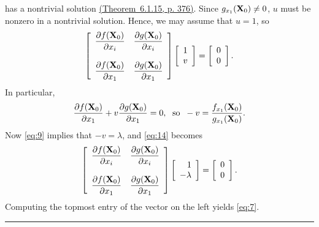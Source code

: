 \documentclass{article}
\newcommand{\bbox}{\phantom{1}\hfill{\rule{6pt}{6pt}}}
\newcommand{\dst}{\displaystyle}
\begin{document}
has a nontrivial
solution
\href{http://ramanujan.math.trinity.edu/wtrench/index.shtml}
{(Theorem~6.1.15, p. 376)}.
 Since $g_{x_{1}}({\bf X}_{0})\ne0$, $u$ must be nonzero in a
nontrivial solution. Hence, we may assume that $u=1$, so
\begin{equation} \label{eq:14}
 \left[\begin{array}{ccccccc}
\dst{\frac{{\partial f({\bf X}_{0})}}{{\partial x_{i}}}}&
\dst{\frac{{\partial g({\bf X}_{0})}}{{\partial x_{i}}}}\\\\
\dst{\frac{{\partial f({\bf X}_{0})}}{{\partial x_{1}}}}&
\dst{\frac{{\partial g({\bf X}_{0})}}{{\partial x_{1}}}} \end{array}\right]
\left[\begin{array}{ccccccc} 1\\ v \end{array}\right]=
\left[\begin{array}{ccccccc} 0\\0 \end{array}\right].
\end{equation}
In particular,
$$
\frac{\partial f({\bf X}_{0})}{\partial x_{1}}+
v\frac{\partial g({\bf X}_{0})}{\partial x_{1}}=0, \text{\; so\;\;}
-v=\frac{f_{x_{1}}({\bf X}_{0})}{g_{x_{1}}({\bf X}_{0})}.
$$
Now \eqref{eq:9} implies that $-v=\lambda$, and  \eqref{eq:14}  becomes
$$
 \left[\begin{array}{ccccccc}
\dst{\frac{{\partial f({\bf X}_{0})}}{{\partial x_{i}}}}&
\dst{\frac{{\partial g({\bf X}_{0})}}{{\partial x_{i}}}}\\\\
\dst{\frac{{\partial f({\bf X}_{0})}}{{\partial x_{1}}}}&
\dst{\frac{{\partial g({\bf X}_{0})}}{{\partial x_{1}}}} \end{array}\right]
\left[\begin{array}{rcccccc} 1\\ -\lambda \end{array}\right]=
\left[\begin{array}{ccccccc} 0\\0 \end{array}\right].
$$
Computing the topmost entry of the vector on the left yields
\eqref{eq:7}.
\hfill\bbox
\end{document}
